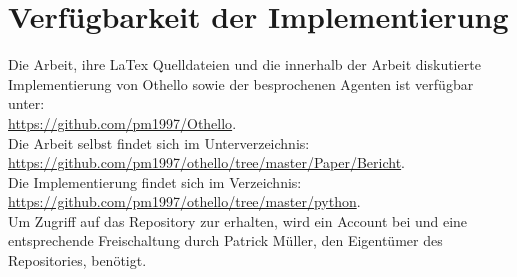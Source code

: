 \chapter*{Verfügbarkeit der Implementierung}
Die Arbeit, ihre LaTex Quelldateien und die innerhalb der Arbeit diskutierte Implementierung von Othello sowie der besprochenen Agenten ist verfügbar unter: 
\\\href{https://github.com/pm1997/Othello}{https://github.com/pm1997/Othello}.
\\Die Arbeit selbst findet sich im Unterverzeichnis:
\\\href{https://github.com/pm1997/othello/tree/master/Paper/Bericht}{https://github.com/pm1997/othello/tree/master/Paper/Bericht}.
\\Die Implementierung findet sich im Verzeichnis:
\\\href{https://github.com/pm1997/othello/tree/master/python}{https://github.com/pm1997/othello/tree/master/python}.
\\Um Zugriff auf das Repository zur erhalten, wird ein Account bei  und eine entsprechende Freischaltung durch Patrick Müller, den Eigentümer des Repositories, benötigt.  